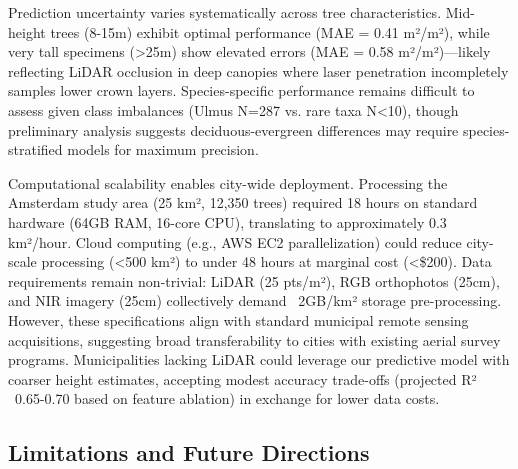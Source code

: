 Prediction uncertainty varies systematically across tree characteristics. Mid-height trees (8-15m) exhibit optimal performance (MAE = 0.41 m²/m²), while very tall specimens (>25m) show elevated errors (MAE = 0.58 m²/m²)—likely reflecting LiDAR occlusion in deep canopies where laser penetration incompletely samples lower crown layers. Species-specific performance remains difficult to assess given class imbalances (Ulmus N=287 vs. rare taxa N<10), though preliminary analysis suggests deciduous-evergreen differences may require species-stratified models for maximum precision.

Computational scalability enables city-wide deployment. Processing the Amsterdam study area (25 km², 12,350 trees) required 18 hours on standard hardware (64GB RAM, 16-core CPU), translating to approximately 0.3 km²/hour. Cloud computing (e.g., AWS EC2 parallelization) could reduce city-scale processing (<500 km²) to under 48 hours at marginal cost (<\$200). Data requirements remain non-trivial: LiDAR (25 pts/m²), RGB orthophotos (25cm), and NIR imagery (25cm) collectively demand ~2GB/km² storage pre-processing. However, these specifications align with standard municipal remote sensing acquisitions, suggesting broad transferability to cities with existing aerial survey programs. Municipalities lacking LiDAR could leverage our predictive model with coarser height estimates, accepting modest accuracy trade-offs (projected R² ~0.65-0.70 based on feature ablation) in exchange for lower data costs.

\subsection{Limitations and Future Directions}

